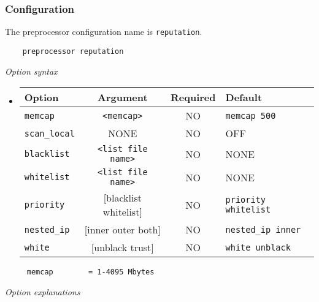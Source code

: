 \documentclass[english]{report}
\begin{document}
\subsubsection{Configuration}
The preprocessor configuration name is \texttt{reputation}.\\

\begin{verbatim}
    preprocessor reputation
\end{verbatim}
\textit{Option syntax}
\begin{itemize}

\item[]
\begin{tabular}{|l|c|c|p{6cm}|}
\hline
Option & Argument & Required & Default\\
\hline
\hline
\texttt{memcap} & \texttt{<memcap>} & NO & \texttt{memcap 500}\\
\hline
\texttt{scan\_local} & NONE & NO & OFF\\
\hline
\texttt{blacklist} & \texttt{<list file name>} & NO & NONE\\
\hline
\texttt{whitelist} & \texttt{<list file name>} & NO & NONE\\
\hline
\texttt{priority} & [blacklist whitelist] & NO & \texttt{priority whitelist}\\
\hline
\texttt{nested\_ip} & [inner outer both] & NO & \texttt{nested\_ip inner}\\
\hline
\texttt{white} & [unblack trust] & NO & \texttt{white unblack}\\
\hline
\end{tabular}
\end{itemize}
\footnotesize
\begin{verbatim}
     memcap        = 1-4095 Mbytes  
\end{verbatim}
\normalsize
\textit{Option explanations}
\end{document}
